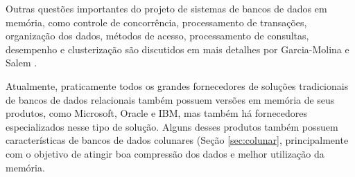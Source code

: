 Outras questões importantes do projeto de sistemas de bancos de dados em memória, como controle de concorrência, processamento de transações, organização dos dados, métodos de acesso, processamento de consultas, desempenho e clusterização são discutidos em mais detalhes por Garcia-Molina e Salem \cite{garcia1992main}.

Atualmente, praticamente todos os grandes fornecedores de soluções tradicionais de bancos de dados 
relacionais também possuem versões em memória de seus produtos, como Microsoft, Oracle e IBM, mas 
também há fornecedores especializados nesse tipo de solução. Alguns desses produtos também possuem 
características de bancos de dados colunares (Seção \ref{sec:colunar}, principalmente com o objetivo 
de atingir boa compressão dos dados e melhor utilização da memória.





